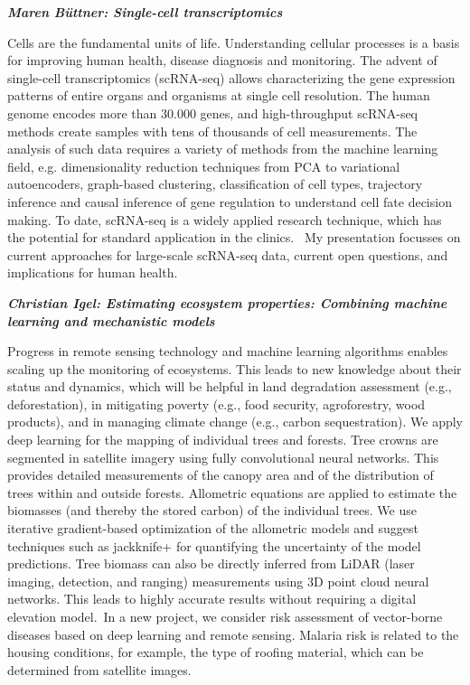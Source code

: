 {\emph{\textbf{Maren Büttner: Single-cell transcriptomics}}

Cells are the fundamental units of life. Understanding cellular
processes is a basis for improving human health, disease diagnosis and
monitoring. The advent of single-cell transcriptomics (scRNA-seq) allows
characterizing the gene expression patterns of entire organs and
organisms at single cell resolution. The human genome encodes more than
30.000 genes, and high-throughput scRNA-seq methods create samples with
tens of thousands of cell measurements. The analysis of such data
requires a variety of methods from the machine learning field, e.g.
dimensionality reduction techniques from PCA to variational
autoencoders, graph-based clustering, classification of cell types,
trajectory inference and causal inference of gene regulation to
understand cell fate decision making. To date, scRNA-seq is a widely
applied research technique, which has the potential for standard
application in the clinics.~ My presentation focusses on current
approaches for large-scale scRNA-seq data, current open questions, and
implications for human health.~~~~~~

\emph{\textbf{Christian Igel: Estimating ecosystem properties: Combining
machine learning and mechanistic models}}

Progress in remote sensing technology and machine learning algorithms
enables scaling up the monitoring of ecosystems. This leads to new
knowledge about their status and dynamics, which will be helpful in land
degradation assessment (e.g., deforestation), in mitigating poverty
(e.g., food security, agroforestry, wood products), and in managing
climate change (e.g., carbon sequestration). We apply deep learning for
the mapping of individual trees and forests. Tree crowns are segmented
in satellite imagery using fully convolutional neural networks. This
provides detailed measurements of the canopy area and of the
distribution of trees within and outside forests. Allometric equations
are applied to estimate the biomasses (and thereby the stored carbon) of
the individual trees. We use iterative gradient-based optimization of
the allometric models and suggest techniques such as jackknife+ for
quantifying the uncertainty of the model predictions. Tree biomass can
also be directly inferred from LiDAR (laser imaging, detection, and
ranging) measurements using 3D point cloud neural networks. This leads
to highly accurate results without requiring a digital elevation
model.~In a new project, we consider risk assessment of vector-borne
diseases based on deep learning and remote sensing. Malaria risk is
related to the housing conditions, for example, the type of roofing
material, which can be determined from satellite images.

}

